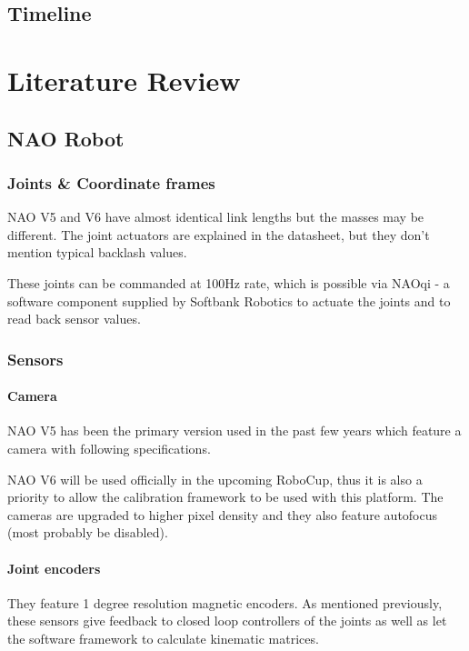 \documentclass[english, printversion, nomenclature, notitle]{tuvisionthesis} %
\begin{document}
\section{Timeline}

\chapter{Literature Review}

\section{NAO Robot}

\subsection{Joints \& Coordinate frames}
NAO V5 and V6 have almost identical link lengths but the masses may be different. The joint actuators are explained in the datasheet, but they don't mention typical backlash values. 

These joints can be commanded at 100Hz rate, which is possible via NAOqi - a software component supplied by Softbank Robotics to actuate the joints and to read back sensor values.

\subsection{Sensors}
\subsubsection{Camera}
NAO V5 has been the primary version used in the past few years which feature a camera with following specifications.

NAO V6 will be used officially in the upcoming RoboCup, thus it is also a priority to allow the calibration framework to be used with this platform. The cameras are upgraded to higher pixel density and they also feature autofocus (most probably be disabled).

\subsubsection{Joint encoders}
They feature 1 degree resolution magnetic encoders. As mentioned previously, these sensors give feedback to closed loop controllers of the joints as well as let the software framework to calculate kinematic matrices.
\end{document}

